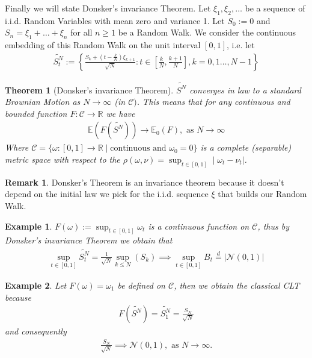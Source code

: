 \documentclass[11pt,a4paper, final]{article}
\newtheorem{thm}{Theorem}[section]
\newtheorem{exmp}{Example}[section]
\theoremstyle{definition}
\newtheorem{rem}{Remark}[section]
\begin{document}
\newpage
\noindent Finally we will state Donsker's invariance Theorem. Let $\xi_1, \xi_2, \dots$ be a sequence of i.i.d. Random Variables with mean zero and variance 1. Let $S_0:=0$ and $S_n = \xi_1 + \dots + \xi_n$ for all $n \geq 1$ be a Random Walk. We consider the continuous embedding of this Random Walk on the unit interval $[0,1]$, i.e. let 
\begin{align*}
\widetilde{S_t^N}:= \left\lbrace \frac{S_k+ \left( t- \frac{k}{N}\right) \xi_{k+1}}{\sqrt{N}} : t \in \left[ \frac{k}{N}, \frac{k+1}{N} \right], k = 0,1 \dots , N-1 \right\rbrace 
\end{align*}
\begin{thm}[Donsker's invariance Theorem] $\widetilde{S^N}$ converges in law to a standard Brownian Motion as $N \to \infty$ (in $\mathcal{C})$. This means that for any continuous and bounded function $F: \mathcal{C} \to \mathbb{R}$ we have 
\begin{align*}
\mathbb{E} \left( F \left( \widetilde{S^N} \right) \right) \to \mathbb{E}_0(F), \text{ as } N \to \infty 
\end{align*}
Where $\mathcal{C}=  \lbrace \omega : [0,1] \to \mathbb{R} \mid \text{continuous and } \omega_0 =0 \rbrace$ is a complete (separable) metric space with respect to the $\rho( \omega, \nu) = \sup_{t \in [0,1]} \mid \omega_t - \nu_t |$. 
\end{thm}
\begin{rem} Donsker's Theorem is an invariance theorem because it doesn't depend on the initial law we pick for the i.i.d. sequence $\xi$ that builds our Random Walk. 
\end{rem}
\begin{exmp} $F( \omega):= \sup_{t \in [0,1]} \omega_t$ is a continuous function on $\mathcal{C}$, thus by Donsker's invariance Theorem we obtain that 
\begin{align*}
 \sup_{t \in [0,1]} \widetilde{S_t^N} = \frac{1}{\sqrt{N}} \sup_{k \leq N} (S_k) \implies  \sup_{t \in [0,1]} B_t \overset{d}= | \mathcal{N}(0,1) | 
\end{align*}
\end{exmp}
\begin{exmp} Let $F( \omega) = \omega_1$ be defined on $\mathcal{C}$, then we obtain the classical CLT because 
\begin{align*}
F(\widetilde{S^N})=\widetilde{S_1^N} = \frac{S_N}{\sqrt{N}} 
\end{align*}
and consequently 
\begin{align*}
\frac{S_N}{\sqrt{N}} \implies \mathcal{N}(0,1), \text{ as } N \to \infty. 
\end{align*}
\end{exmp}
\end{document}
